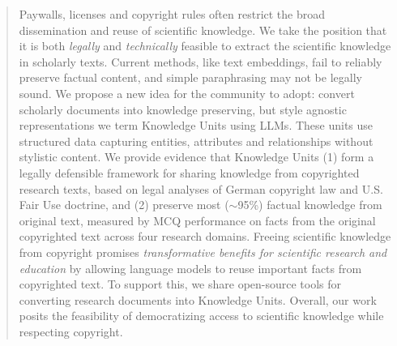 \vspace*{-0.4cm}
\begin{abstract}
Paywalls, licenses and copyright rules often restrict the broad dissemination and reuse of scientific knowledge. We take the position that it is both \textit{legally} and \textit{technically} feasible to extract the scientific knowledge in scholarly texts.  Current methods, like text embeddings, fail to reliably preserve factual content, and simple paraphrasing may not be legally sound.
We propose a new idea for the community to adopt: convert scholarly documents into knowledge preserving, but style agnostic representations we term Knowledge Units  using LLMs. These units use structured data capturing entities, attributes and relationships without stylistic content. We provide evidence that Knowledge Units (1) form a legally defensible framework for sharing knowledge from copyrighted research texts, based on legal analyses of German copyright law and U.S. Fair Use doctrine, and (2) preserve most ($\sim$95\%) factual knowledge from original text, measured by MCQ performance on facts from the original copyrighted text across four research domains. 
Freeing scientific knowledge from copyright promises \textit{transformative benefits for scientific research and education} by allowing language models to reuse important facts from copyrighted text. To support this, we share open-source tools for converting research documents into Knowledge Units. Overall, our work posits the feasibility of democratizing access to scientific knowledge while respecting copyright.\vspace{-0.25cm}
\end{abstract}

